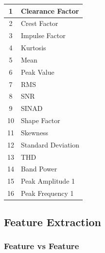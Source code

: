 \documentclass[]{article}
\begin{document}
\begin{center}
\label{featureNames}
\begin{tabular}{ |c|l| }
 \hline
 1 & Clearance Factor \\
 \hline
 2 & Crest Factor \\
 \hline
 3 & Impulse Factor \\
 \hline
 4 & Kurtosis \\
 \hline
 5 & Mean \\
 \hline
 6 & Peak Value \\
 \hline
 7 & \gls{RMS} \\ 
 \hline              
 8 & \gls{SNR}  \\
 \hline
 9 & \gls{SINAD}  \\
 \hline
 10 & Shape Factor \\
 \hline
 11 & Skewness \\
 \hline
 12 & Standard Deviation \\
 \hline
 13 & \gls{THD} \\
 \hline
 14 & Band Power \\
 \hline
 15 & Peak Amplitude 1 \\
 \hline
 16 & Peak Frequency 1 \\
 \hline
\end{tabular}
\end{center}

\subsection{Feature Extraction}
\subsubsection*{Feature vs Feature}
\end{document}
